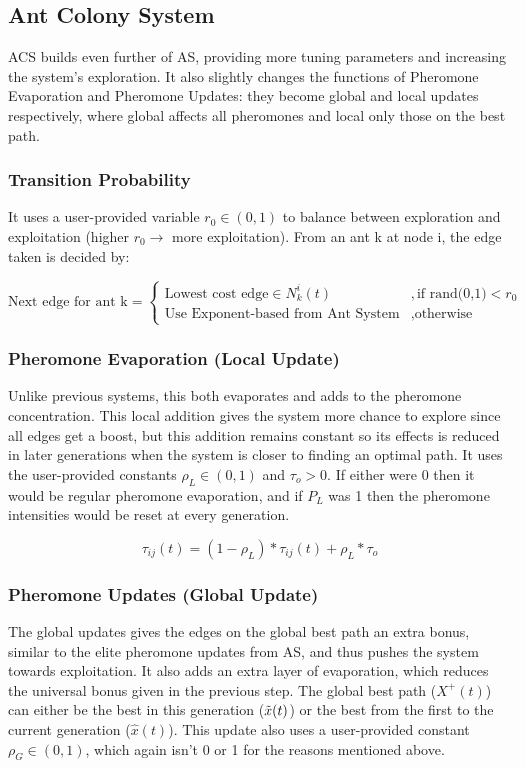 \newpage
\subsection{Ant Colony System}
ACS builds even further of AS, providing more tuning parameters and increasing the system's exploration. It also slightly changes the functions of Pheromone Evaporation and Pheromone Updates: they become global and local updates respectively, where global affects all pheromones and local only those on the best path.

\subsubsection{Transition Probability}
It uses a user-provided variable $r_0 \in (0,1)$ to balance between exploration and exploitation (higher $r_0 \rightarrow$ more exploitation). From an ant k at node i, the edge taken is decided by:

\begin{equation}
    \text{Next edge for ant k} = 
    \begin{cases}
    \text{Lowest cost edge} \in  N^i_k(t) &, \text{if rand(0,1)} < r_0 \\
    \text{Use Exponent-based from Ant System} &, \text{otherwise}
    \end{cases}
\end{equation}


\subsubsection{Pheromone Evaporation (Local Update)}
Unlike previous systems, this both evaporates and adds to the pheromone concentration. This local addition gives the system more chance to explore since all edges get a boost, but this addition remains constant so its effects is reduced in later generations when the system is closer to finding an optimal path. It uses the user-provided constants $\rho_L \in (0,1)$ and $\tau_o > 0$. If either were 0 then it would be regular pheromone evaporation, and if $P_L$ was 1 then the pheromone intensities would be reset at every generation.

\begin{equation}
    \tau_{ij}(t) = (1-\rho_L) * \tau_{ij}(t) + \rho_L * \tau_o
\end{equation}

\subsubsection{Pheromone Updates (Global Update)}
The global updates gives the edges on the global best path an extra bonus, similar to the elite pheromone updates from AS, and thus pushes the system towards exploitation. It also adds an extra layer of evaporation, which reduces the universal bonus given in the previous step. The global best path ($X^+(t)$) can either be the best in this generation ($\Tilde{x}(t)$) or the best from the first to the current generation ($\hat{x}(t)$). This update also uses a user-provided constant $\rho_G \in (0,1)$, which again isn't 0 or 1 for the reasons mentioned above. 

